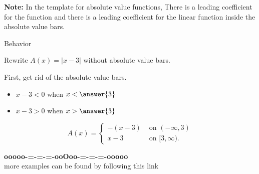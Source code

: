 \documentclass{ximera}
\begin{document}
\textbf{Note:}  In the template for absolute value functions, There is a leading coefficient for the function and there is a leading coefficient for the linear function inside the absolute value bars. \\



\begin{example}  Behavior


Rewrite $A(x) = | x - 3|$ without absolute value bars.



\begin{explanation}


First, get rid of the absolute value bars.

\begin{itemize}
\item $x - 3 < 0$ when $x < \answer{3}$
\item $x - 3 > 0$ when $x > \answer{3}$
\end{itemize}



\[
A(x) = 
\begin{cases}
  -(x - 3) & \text{ on } (-\infty, 3)   \\
  x - 3  & \text{ on } [3, \infty).
\end{cases}
\]






\end{explanation}


\end{example}


















\begin{center}
\textbf{\textcolor{green!50!black}{ooooo-=-=-=-ooOoo-=-=-=-ooooo}} \\

more examples can be found by following this link\\ 

\end{center}
\end{document}

